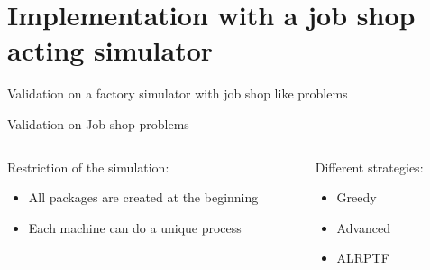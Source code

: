 \section{Implementation with a job shop acting simulator}
\begin{frame}{Validation on a factory simulator with job shop like problems}
   

\begin{frame}{Validation on Job shop problems}
\centering
\begin{columns}
    \begin{column}{0.5\textwidth}
        Restriction of the simulation:
        \begin{itemize}
            \item All packages are created at the beginning
            \item Each machine can do a unique process
        \end{itemize}
    \end{column}
    \begin{column}{0.5\textwidth}
        Different strategies:
        \begin{itemize}
            \item Greedy
            \item Advanced
            \item ALRPTF
        \end{itemize}
    \end{column}
\end{columns}
\end{frame}

\newcommand{\calcrowmean}{
    \def \rowmean{0}
    \pgfmathparse{\pgfkeysvalueof{/pgfplots/table/summary statistics/end index}-\pgfkeysvalueof{/pgfplots/table/summary statistics/start index}+1}
    \edef\numberofcols{\pgfmathresult}
    \pgfplotsforeachungrouped \col in {1,2,3,4,5,6,7,8,9,10}%
    {
        
        \typeout{col = \col}
        
        \pgfmathparse{\rowmean+\thisrowno{\col}/\numberofcols}
        \edef \rowmean{\pgfmathresult}
    }
}
\newcommand{\calcstddev}{
    \def\rowstddev{0}
    \calcrowmean
    \pgfplotsforeachungrouped \col in {1,2,3,4,5,6,7,8,9,10}
    {
        \pgfmathparse{\rowstddev+(\thisrowno{\col}-\rowmean)^2/(\numberofcols-1)}
        \edef\rowstddev{\pgfmathresult}
    }
    \pgfmathparse{sqrt(\rowstddev)}
}
\newcommand{\calcstderror}{
    \calcrowmean
    \calcstddev
    \pgfmathparse{sqrt(\rowstddev)/sqrt(\numberofcols)}
}


\end{frame}
